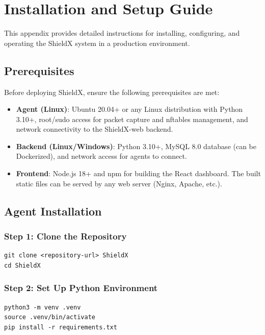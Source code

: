 \documentclass[../Main.tex]{subfiles}
\begin{document}
\section{Installation and Setup Guide}

This appendix provides detailed instructions for installing, configuring, and operating the ShieldX system in a production environment.

\subsection{Prerequisites}

Before deploying ShieldX, ensure the following prerequisites are met:

\begin{itemize}
    \item \textbf{Agent (Linux)}: Ubuntu 20.04+ or any Linux distribution with Python 3.10+, root/sudo access for packet capture and nftables management, and network connectivity to the ShieldX-web backend.
    \item \textbf{Backend (Linux/Windows)}: Python 3.10+, MySQL 8.0 database (can be Dockerized), and network access for agents to connect.
    \item \textbf{Frontend}: Node.js 18+ and npm for building the React dashboard. The built static files can be served by any web server (Nginx, Apache, etc.).
\end{itemize}

\subsection{Agent Installation}

\subsubsection{Step 1: Clone the Repository}

\begin{verbatim}
git clone <repository-url> ShieldX
cd ShieldX
\end{verbatim}

\subsubsection{Step 2: Set Up Python Environment}

\begin{verbatim}
python3 -m venv .venv
source .venv/bin/activate
pip install -r requirements.txt
\end{verbatim}
\end{document}
